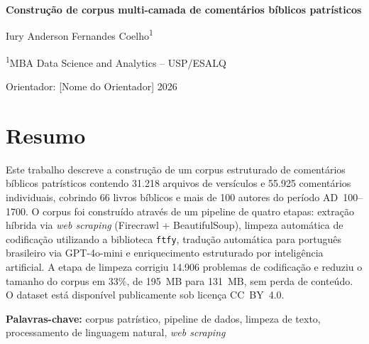\documentclass[11pt,a4paper]{article}
\begin{document}
\begin{titlepage}
\centering
\vspace*{3cm}
{\LARGE\bfseries Constru\c{c}\~{a}o de corpus multi-camada de coment\'{a}rios b\'{i}blicos patr\'{i}sticos}
\vspace{1.5cm}

{\large Iury Anderson Fernandes Coelho\textsuperscript{1}}
\vspace{0.3cm}

{\small\textsuperscript{1}MBA Data Science and Analytics -- USP/ESALQ}
\vspace{2cm}

{\large Orientador: [Nome do Orientador]}
\vfill
{\small 2026}
\end{titlepage}

\section*{Resumo}
\begin{singlespace}
Este trabalho descreve a constru\c{c}\~{a}o de um corpus estruturado de coment\'{a}rios b\'{i}blicos patr\'{i}sticos contendo 31.218 arquivos de vers\'{i}culos e 55.925 coment\'{a}rios individuais, cobrindo 66 livros b\'{i}blicos e mais de 100 autores do per\'{i}odo AD~100--1700. O corpus foi constru\'{i}do atrav\'{e}s de um pipeline de quatro etapas: extra\c{c}\~{a}o h\'{i}brida via \textit{web scraping} (Firecrawl + BeautifulSoup), limpeza autom\'{a}tica de codifica\c{c}\~{a}o utilizando a biblioteca \texttt{ftfy}, tradu\c{c}\~{a}o autom\'{a}tica para portugu\^{e}s brasileiro via GPT-4o-mini e enriquecimento estruturado por intelig\^{e}ncia artificial. A etapa de limpeza corrigiu 14.906 problemas de codifica\c{c}\~{a}o e reduziu o tamanho do corpus em 33\%, de 195~MB para 131~MB, sem perda de conte\'{u}do. O dataset est\'{a} dispon\'{i}vel publicamente sob licen\c{c}a CC~BY~4.0.
\end{singlespace}

\vspace{0.3cm}
\noindent\textbf{Palavras-chave:} corpus patr\'{i}stico, pipeline de dados, limpeza de texto, processamento de linguagem natural, \textit{web scraping}

\end{document}
